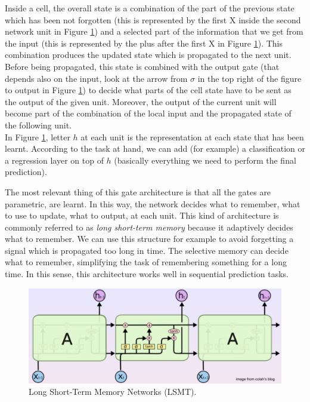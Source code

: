 Inside a cell, the overall state is a combination of the part of the previous state which has been not forgotten (this is represented by the first X inside the second network unit in Figure \ref{fig:lsmt}) and a selected part of the information that we get from the input (this is represented by the plus after the first X in Figure \ref{fig:lsmt}). This combination produces the updated state which is propagated to the next unit. Before being propagated, this state is combined with the output gate (that depends also on the input, look at the arrow from $\sigma$ in the top right of the figure to output in Figure \ref{fig:lsmt}) to decide what parts of the cell state have to be sent as the output of the given unit. Moreover, the output of the current unit will become part of the combination of the local input and the propagated state of the following unit. \\
In Figure \ref{fig:lsmt}, letter $h$ at each unit is the representation at each state that has been learnt. According to the task at hand, we can add (for example) a classification or a regression layer on top of $h$ (basically everything we need to perform the final prediction). \newline

The most relevant thing of this gate architecture is that all the gates are parametric, are learnt. In this way, the network decides what to remember, what to use to update, what to output, at each unit. This kind of architecture is commonly referred to as \textit{long short-term memory} because it adaptively decides what to remember. We can use this structure for example to avoid forgetting a signal which is propagated too long in time. The selective memory can decide what to remember, simplifying the task of remembering something for a long time. In this sense, this architecture works well in sequential prediction tasks.

\begin{figure}
    \centering
    \includegraphics[width=\textwidth]{images/lsmt.png}
    \caption{Long Short-Term Memory Networks (LSMT).}
    \label{fig:lsmt}
\end{figure}

